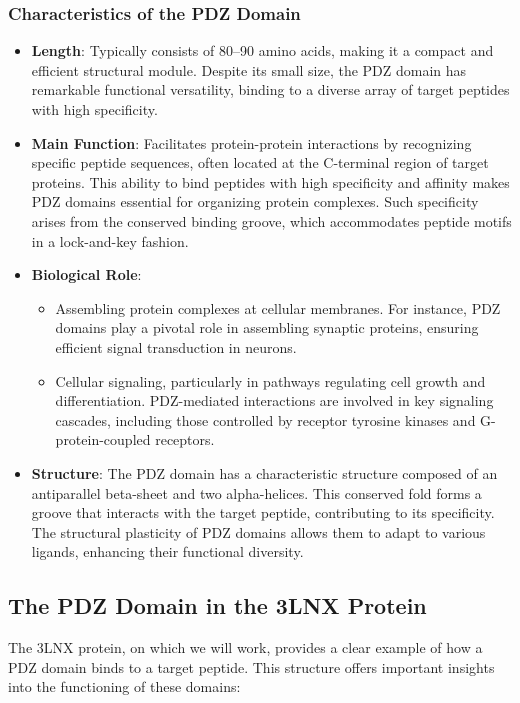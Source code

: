 \documentclass[English, Lau, oneside]{sapthesis}
\begin{document}
\subsubsection{Characteristics of the PDZ Domain}
\begin{itemize}
    \item \textbf{Length}: Typically consists of 80--90 amino acids, making it a compact and efficient structural module. Despite its small size, the PDZ domain has remarkable functional versatility, binding to a diverse array of target peptides with high specificity.
    \item \textbf{Main Function}: Facilitates protein-protein interactions by recognizing specific peptide sequences, often located at the C-terminal region of target proteins. This ability to bind peptides with high specificity and affinity makes PDZ domains essential for organizing protein complexes. Such specificity arises from the conserved binding groove, which accommodates peptide motifs in a lock-and-key fashion.\cite{song1997}
    \item \textbf{Biological Role}:
    \begin{itemize}
        \item Assembling protein complexes at cellular membranes. For instance, PDZ domains play a pivotal role in assembling synaptic proteins, ensuring efficient signal transduction in neurons.
        \item Cellular signaling, particularly in pathways regulating cell growth and differentiation. PDZ-mediated interactions are involved in key signaling cascades, including those controlled by receptor tyrosine kinases and G-protein-coupled receptors.
    \end{itemize}
    \item \textbf{Structure}: The PDZ domain has a characteristic structure composed of an antiparallel beta-sheet and two alpha-helices. This conserved fold forms a groove that interacts with the target peptide, contributing to its specificity. The structural plasticity of PDZ domains allows them to adapt to various ligands, enhancing their functional diversity.\cite{harris2001}
\end{itemize}

\subsection{The PDZ Domain in the 3LNX Protein}

\noindent The 3LNX protein, on which we will work, provides a clear example of how a PDZ domain binds to a target peptide. This structure offers important insights into the functioning of these domains:
\end{document}
